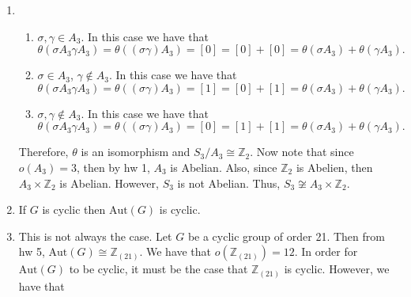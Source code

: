 \documentclass[12pt]{article}
\makeatletter
\theoremstyle{definition}
\theoremstyle{remark}
\renewenvironment{proof}[1][\proofname]{\par
  \pushQED{\qed}%
  \normalfont \topsep6\p@\@plus6\p@\relax
  \list{}{\leftmargin=0mm
          \rightmargin=4mm
          \settowidth{\itemindent}{\itshape#1}%
          \labelwidth=\itemindent
          \parsep=0pt \listparindent=\parindent 
  }
  \item[\hskip\labelsep
        \itshape
    #1\@addpunct{.}]\ignorespaces
}{%
  \popQED\endlist\@endpefalse
}
\let\oldproofname=\proofname
\renewcommand{\proofname}{\bf{\textit{\oldproofname}}}
\makeatother
\begin{document}
\begin{enumerate}[leftmargin=*]
\begin{enumerate}[label=(\alph*)]
\begin{proof}
                            \begin{enumerate}[label=(\roman*)]
                                \item $\sigma,\gamma\in A_3$. In this case we have that 
                                    \begin{equation*}
                                        \theta(\sigma A_3\gamma A_3)=\theta((\sigma\gamma)A_3)=[0]=[0]+[0]=\theta(\sigma A_3)+\theta(\gamma A_3).
                                    \end{equation*}
                                \item $\sigma\in A_3$, $\gamma\notin A_3$. In this case we have that
                                    \begin{equation*}
                                        \theta(\sigma A_3\gamma A_3)=\theta((\sigma\gamma)A_3)=[1]=[0]+[1]=\theta(\sigma A_3)+\theta(\gamma A_3).
                                    \end{equation*}
                                \item $\sigma,\gamma\notin A_3$. In this case we have that
                                    \begin{equation*}
                                        \theta(\sigma A_3\gamma A_3)=\theta((\sigma\gamma)A_3)=[0]=[1]+[1]=\theta(\sigma A_3)+\theta(\gamma A_3).
                                    \end{equation*}
                            \end{enumerate}
                            
                            Therefore, $\theta$ is an isomorphism and $S_3/A_3\cong\mathbb{Z}_2$. Now note that since $o(A_3)=3$, then by hw 1, $A_3$ is Abelian. Also, since $\mathbb{Z}_2$ is Abelien, then $A_3\times\mathbb{Z}_2$ is Abelian. However, $S_3$ is not Abelian. Thus, $S_3\not\cong A_3\times\mathbb{Z}_2$.
                        \end{proof}
                    \newpage
                    
                    \item If $G$ is cyclic then $\text{Aut}(G)$ is cyclic.
                        \begin{proof}
                            This is not always the case. Let $G$ be a cyclic group of order 21. Then from hw 5, $\text{Aut}(G)\cong\mathbb{Z}_{(21)}$. We have that $o(\mathbb{Z}_{(21)})=12$. In order for $\text{Aut}(G)$ to be cyclic, it must be the case that $\mathbb{Z}_{(21)}$ is cyclic. However, we have that 
                            

\end{proof}
\end{enumerate}
\end{enumerate}
\end{document}
